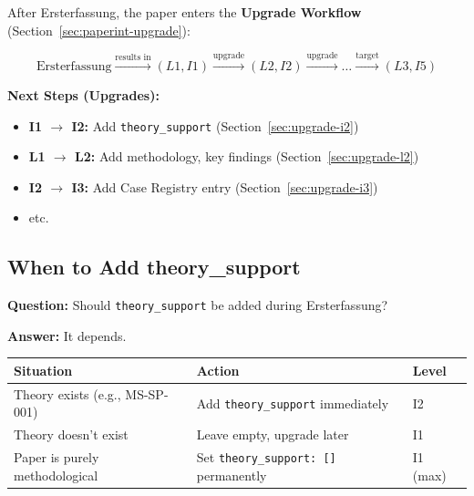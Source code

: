 \begin{tcolorbox}[colback=blue!5!white, colframe=blue!75!black,
    title=\textbf{Connection to Upgrade Workflow}]

After Ersterfassung, the paper enters the \textbf{Upgrade Workflow} (Section~\ref{sec:paperint-upgrade}):

\begin{equation}
\text{Ersterfassung} \xrightarrow{\text{results in}} (L1, I1) \xrightarrow{\text{upgrade}} (L2, I2) \xrightarrow{\text{upgrade}} \ldots \xrightarrow{\text{target}} (L3, I5)
\end{equation}

\textbf{Next Steps (Upgrades):}
\begin{itemize}[nosep]
    \item \textbf{I1 $\rightarrow$ I2:} Add \texttt{theory\_support} (Section~\ref{sec:upgrade-i2})
    \item \textbf{L1 $\rightarrow$ L2:} Add methodology, key findings (Section~\ref{sec:upgrade-l2})
    \item \textbf{I2 $\rightarrow$ I3:} Add Case Registry entry (Section~\ref{sec:upgrade-i3})
    \item etc.
\end{itemize}

\end{tcolorbox}

\subsection{When to Add theory\_support}
\label{sec:ersterfassung-theory}

\textbf{Question:} Should \texttt{theory\_support} be added during Ersterfassung?

\textbf{Answer:} It depends.

\begin{table}[H]
\centering
\begin{tabular}{@{}lll@{}}
\toprule
\textbf{Situation} & \textbf{Action} & \textbf{Level} \\
\midrule
Theory exists (e.g., MS-SP-001) & Add \texttt{theory\_support} immediately & I2 \\
Theory doesn't exist & Leave empty, upgrade later & I1 \\
Paper is purely methodological & Set \texttt{theory\_support: []} permanently & I1 (max) \\
\bottomrule
\end{tabular}
\end{table}

